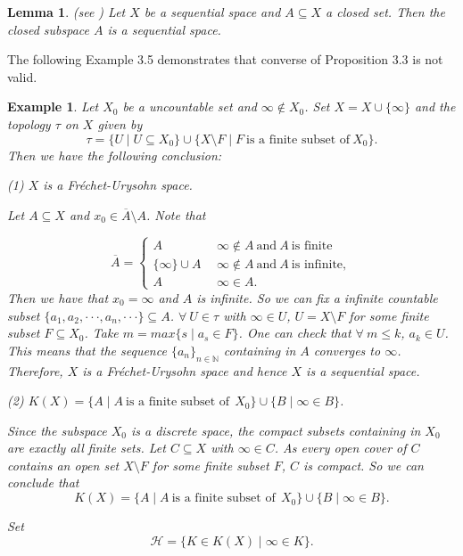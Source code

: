 \documentclass[preprint,12pt]{elsarticle}
\numberwithin{equation}{section}
\newtheorem{lemma}[theorem]{Lemma}
\newtheorem{example}[theorem]{Example}
\begin{document}
\begin{lemma} {\rm (see \cite{RE77}) Let $X$ be a sequential space and $A\subseteq X$ a closed set. Then the closed subspace $A$ is a sequential space.}
\end{lemma}

The following Example 3.5 demonstrates that converse of Proposition 3.3 is not valid.

\begin{example} {\rm Let $X_{0}$ be a uncountable set and $\infty\not\in X_{0}$. Set $X=X\cup\{\infty\}$ and the topology $\tau$ on $X$ given by
$$\tau=\{U\mid U\subseteq X_{0}\}\cup\{X\setminus F\mid F\ \mbox{is a finite subset of}\ X_{0}\}.$$ Then we have the following conclusion:

(1) $X$ is a Fr\'echet-Urysohn space.

Let $A\subseteq X$ and $x_{0}\in \overline{A}\setminus A$. Note that

$$\overline{A}=\left\{
             \begin{array}{ll}
              A &\ \ \infty\not\in A\ \mbox{and}\ A\ \mbox{is finite}\, \\
              \{\infty\}\cup A &\ \ \infty\not\in A\ \mbox{and}\ A\ \mbox{is infinite},\\
              A&\ \ \infty\in A.\
             \end{array}
           \right.$$
Then we have that $x_{0}=\infty$ and $A$ is infinite. So we can fix a infinite countable subset $\{a_{1},a_{2},\cdot\cdot\cdot,a_{n},\cdot\cdot\cdot\}\subseteq A$. $\forall\ U\in\tau$ with $\infty\in U$, $U=X\setminus F$ for some finite subset $F\subseteq X_{0}$. Take $m=max\{s\mid a_{s}\in F\}$. One can check that $\forall\ m\leq k$, $a_{k}\in U$. This means that the sequence $\{a_{n}\}_{n\in\mathbb{N}}$ containing in $A$ converges to $\infty$. Therefore, $X$ is a Fr\'echet-Urysohn space and hence $X$ is a sequential space.



(2) $K(X)=\{A\mid A\ \mbox{is a finite subset of}\ \ X_{0}\}\cup\{B\mid \infty\in B\}$.

Since the subspace $X_{0}$ is a discrete space, the compact subsets containing in $X_{0}$ are exactly all finite sets. Let $C\subseteq X$ with $\infty\in C$. As every open cover of $C$ contains an open set $X\setminus F$ for some finite subset $F$, $C$ is compact. So we can conclude that $$K(X)=\{A\mid A\ \mbox{is a finite subset of}\ \ X_{0}\}\cup\{B\mid \infty\in B\}.$$

Set
 $$\mathcal{H}=\{K\in K(X)\mid \infty\in K\}.$$

}
\end{example}
\end{document}
